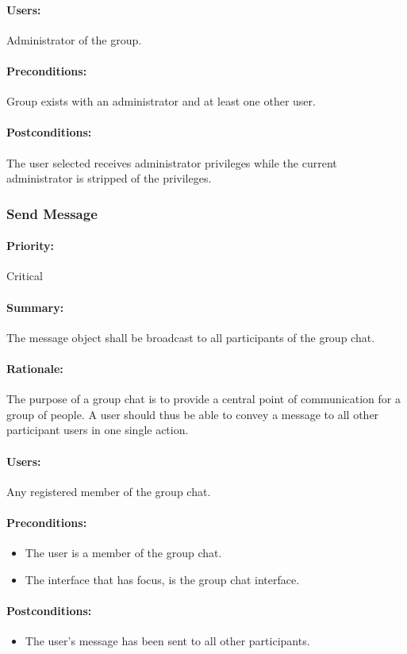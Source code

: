 \documentclass[11pt]{article}
\begin{document}
\paragraph{Users:}
Administrator of the group.
\paragraph{Preconditions:}
Group exists with an administrator and at least one other user.
\paragraph{{Postconditions:}}
The user selected receives administrator privileges while the current administrator is stripped of the privileges.
\subsubsection{Send Message} \label{UC-send-message}
\paragraph{Priority:} Critical
\paragraph{Summary:} The message object shall be broadcast to all participants of the group chat.
\paragraph{Rationale:} The purpose of a group chat is to provide a central point of communication for a group of people. A user should thus be able to convey a message to all other participant users in one single action.
\paragraph{Users:} Any registered member of the group chat.
\paragraph{Preconditions:} 
\begin{itemize}
\item The user is a member of the group chat.
\item The interface that has focus, is the group chat interface.
\end{itemize}
\paragraph{{Postconditions:}}
\begin{itemize}
\item The user's message has been sent to all other participants.
\end{itemize}
\end{document}
